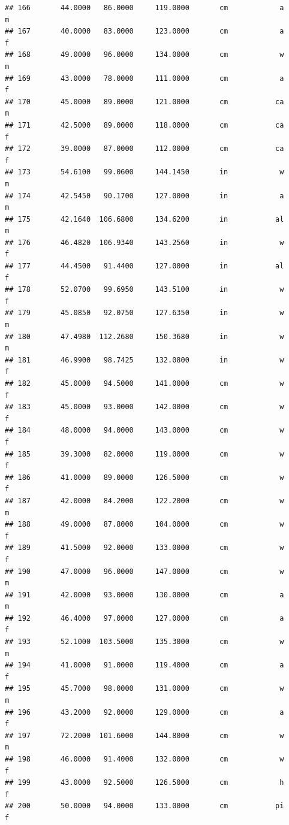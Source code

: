 \documentclass[]{article}
\begin{document}
\begin{verbatim}
## 166       44.0000   86.0000     119.0000       cm            a         m
## 167       40.0000   83.0000     123.0000       cm            a         f
## 168       49.0000   96.0000     134.0000       cm            w         m
## 169       43.0000   78.0000     111.0000       cm            a         f
## 170       45.0000   89.0000     121.0000       cm           ca         m
## 171       42.5000   89.0000     118.0000       cm           ca         f
## 172       39.0000   87.0000     112.0000       cm           ca         f
## 173       54.6100   99.0600     144.1450       in            w         m
## 174       42.5450   90.1700     127.0000       in            a         m
## 175       42.1640  106.6800     134.6200       in           al         m
## 176       46.4820  106.9340     143.2560       in            w         f
## 177       44.4500   91.4400     127.0000       in           al         f
## 178       52.0700   99.6950     143.5100       in            w         f
## 179       45.0850   92.0750     127.6350       in            w         m
## 180       47.4980  112.2680     150.3680       in            w         m
## 181       46.9900   98.7425     132.0800       in            w         f
## 182       45.0000   94.5000     141.0000       cm            w         f
## 183       45.0000   93.0000     142.0000       cm            w         f
## 184       48.0000   94.0000     143.0000       cm            w         f
## 185       39.3000   82.0000     119.0000       cm            w         f
## 186       41.0000   89.0000     126.5000       cm            w         f
## 187       42.0000   84.2000     122.2000       cm            w         m
## 188       49.0000   87.8000     104.0000       cm            w         f
## 189       41.5000   92.0000     133.0000       cm            w         f
## 190       47.0000   96.0000     147.0000       cm            w         m
## 191       42.0000   93.0000     130.0000       cm            a         m
## 192       46.4000   97.0000     127.0000       cm            a         f
## 193       52.1000  103.5000     135.3000       cm            w         m
## 194       41.0000   91.0000     119.4000       cm            a         f
## 195       45.7000   98.0000     131.0000       cm            w         m
## 196       43.2000   92.0000     129.0000       cm            a         f
## 197       72.2000  101.6000     144.8000       cm            w         m
## 198       46.0000   91.4000     132.0000       cm            w         f
## 199       43.0000   92.5000     126.5000       cm            h         f
## 200       50.0000   94.0000     133.0000       cm           pi         f

\end{verbatim}
\end{document}
